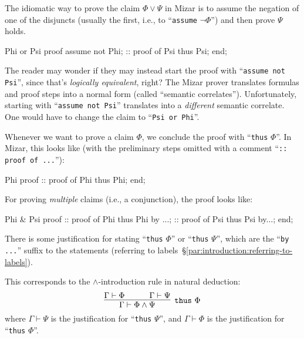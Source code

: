 The idiomatic way to prove the claim $\Phi\lor\Psi$ in Mizar is to
assume the negation of one of the disjuncts (usually the first, i.e.,
to ``\verb#assume# $\neg\Phi$'') and then prove $\Psi$ holds.
\begin{mizar}
Phi or Psi
proof
  assume not Phi;
  :: proof of Psi
  thus Psi;
end;
\end{mizar}

\begin{ddanger}
  The reader may wonder if they may instead start the proof with
  ``\verb#assume not Psi#'', since that's \emph{logically equivalent}, right?
  The Mizar prover translates formulas and proof steps into a normal
  form (called ``semantic correlates'').
  Unfortunately, starting with ``\verb#assume not Psi#'' translates into
  a \emph{different} semantic correlate. One would have to change the
  claim to ``\verb#Psi or Phi#''.
\end{ddanger}

Whenever we want to prove a claim $\Phi$, we conclude the proof with
``\texttt{thus} $\Phi$''. In Mizar, this looks like (with the
preliminary steps omitted with a comment ``\verb#:: proof of ...#''):

\begin{mizar}
Phi
proof
  :: proof of Phi
  thus Phi;
end;
\end{mizar}

For proving \emph{multiple} claims (i.e., a conjunction), the proof
looks like:

\begin{mizar}
Phi & Psi
proof
  :: proof of Phi
  thus Phi by ...;
  :: proof of Psi
  thus Psi by...;
end;
\end{mizar}
There is some justification for stating ``\verb#thus# $\Phi$'' or
``\verb#thus# $\Psi$'', which are the ``\verb#by ...#'' suffix to the
statements (referring to labels~\S\ref{par:introduction:referring-to-labels}). 

This corresponds to the $\land$-introduction rule in natural deduction:
\begin{equation}
  \infer[\mathtt{thus}~\Phi]{\Gamma\vdash\Phi\land\Psi}{
    \Gamma\vdash\Phi &\qquad \Gamma\vdash\Psi}
\end{equation}
where $\Gamma\vdash\Psi$ is the justification for ``\verb#thus# $\Psi$'',
and $\Gamma\vdash\Phi$ is the justification for ``\verb#thus# $\Phi$''.

